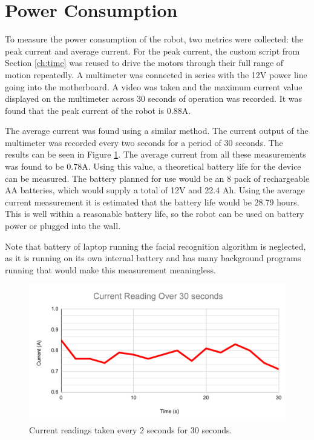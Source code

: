 \section{Power Consumption}
To measure the power consumption of the robot, two metrics were collected: the peak current and average current. For the peak current, the custom script from Section \ref{ch:time} was reused to drive the motors through their full range of motion repeatedly. A multimeter was connected in series with the 12V power line going into the motherboard. A video was taken and the maximum current value displayed on the multimeter across 30 seconds of operation was recorded. It was found that the peak current of the robot is 0.88A.

The average current was found using a similar method. The current output of the multimeter was recorded every two seconds for a period of 30 seconds. The results can be seen in Figure \ref{fig:current-graph}. The average current from all these measurements was found to be 0.78A. Using this value, a theoretical battery life for the device can be measured. The battery planned for use would be an 8 pack of rechargeable AA batteries, which would supply a total of 12V and 22.4 Ah. Using the average current measurement it is estimated that the battery life would be 28.79 hours. This is well within a reasonable battery life, so the robot can be used on battery power or plugged into the wall.

Note that battery of laptop running the facial recognition algorithm is neglected, as it is running on its own internal battery and has many background programs running that would make this measurement meaningless.

\begin{figure}[h]
    \centering
    \includegraphics[width=0.7\linewidth]{Thesis/ch5/Current Reading Over 30 seconds.pdf}
    \caption{Current readings taken every 2 seconds for 30 seconds.}
    \label{fig:current-graph}
\end{figure}

